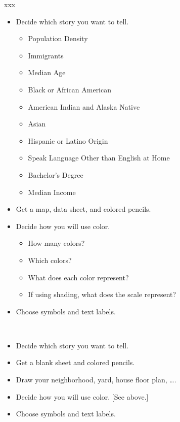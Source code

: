 \documentclass[final]{beamer}
\begin{document}
\begin{frame}[plain]{}
\begin{columns}[t]
\begin{column}{.3\linewidth} {\color{white} xxx}
\begin{block}{}
		\begin{itemize}
			\setlength\itemsep{0.4em}
			\item Decide which story you want to tell.
			\vskip 4pt
			\begin{itemize}
				\setlength\itemsep{0.2em}
				\item Population Density
				\item Immigrants
				\item Median Age
				\item Black or African American
				\item American Indian and Alaska Native
				\item Asian
				\item Hispanic or Latino Origin
				\item Speak Language Other than English at Home
				\item Bachelor's Degree
				\item Median Income
			\end{itemize}
			\item Get a map, data sheet, and colored pencils.
			\item Decide how you will use color.
			\vskip 4pt
			\begin{itemize}
				\setlength\itemsep{0.2em}
				\item How many colors?
				\item Which colors?
				\item What does each color represent?
				\item If using shading, what does the scale represent?
			\end{itemize}
			\item Choose symbols and text labels.
		\end{itemize}
		
	\end{block}

	\begin{block}{}
		
		\
		
		\begin{itemize}
			\setlength\itemsep{0.4em}
			\item Decide which story you want to tell.
			\item Get a blank sheet and colored pencils.
			\item Draw your neighborhood, yard, house floor plan, \dots .
			\item Decide how you will use color. [See above.]
			\item Choose symbols and text labels.
		\end{itemize}
	\end{block}


\end{column}
\end{columns}
\end{frame}
\end{document}
